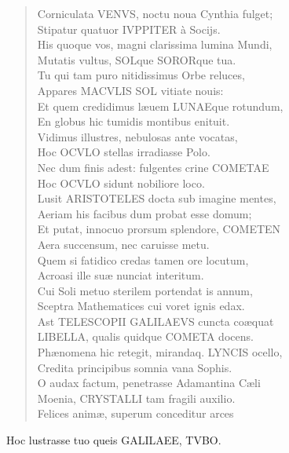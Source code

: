 \documentclass[11pt,twoside,openany]{book}
\begin{document}
\begin{otherlanguage}{latin}
\begin{verse}
Corniculata VENVS, noctu noua Cynthia fulget; \\
Stipatur quatuor IVPPITER à Socijs. \\
His quoque vos, magni clarissima lumina Mundi, \\
Mutatis vultus, SOLque SORORque tua. \\
Tu qui tam puro nitidissimus Orbe reluces, \\
Appares MACVLIS SOL vitiate nouis: \\
Et quem credidimus læuem LUNAEque rotundum, \\
En globus hic tumidis montibus enituit. \\
Vidimus illustres, nebulosas ante vocatas, \\
Hoc OCVLO stellas irradiasse Polo. \\
Nec dum finis adest: fulgentes crine COMETAE \\
Hoc OCVLO sidunt nobiliore loco. \\
Lusit ARISTOTELES docta sub imagine mentes, \\
Aeriam his facibus dum probat esse domum; \\
Et putat, innocuo prorsum splendore, COMETEN \\
Aera succensum, nec caruisse metu. \\
Quem si fatidico credas tamen ore locutum, \\
Acroasi ille suæ nunciat interitum. \\
Cui Soli metuo sterilem portendat is annum, \\
Sceptra Mathematices cui voret ignis edax. \\
Ast TELESCOPII GALILAEVS cuncta coæquat \\
LIBELLA, qualis quidque COMETA docens. \\
Phænomena hic retegit, mirandaq. LYNCIS ocello, \\
Credita principibus somnia vana Sophis. \\
O audax factum, penetrasse Adamantina Cæli \\
Moenia, CRYSTALLI tam fragili auxilio. \\
Felices animæ, superum conceditur arces \\
\end{verse}
\begin{flushright}

Hoc lustrasse tuo queis GALILAEE, TVBO.

\end{flushright}
\end{otherlanguage}
\end{document}
